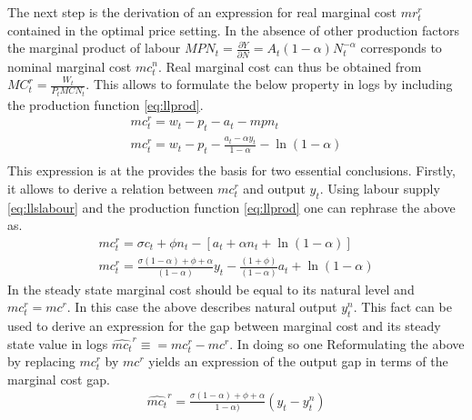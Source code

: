 \documentclass[12pt,a4paper,english]{article} %
\begin{document}
	The next step is the derivation of an expression for real marginal cost $mr_{t}^r$ contained in the optimal price setting. In the absence of other production factors the marginal product of labour $MPN_t = \frac{\partial Y}{\partial N} = A_t (1- \alpha) N_t^{-\alpha}$ corresponds to nominal marginal cost $mc_t^n$. Real marginal cost can thus be obtained from $MC_t^r = \frac{W_t}{P_t MCN_t}$. This allows to formulate the below property in logs by including the production function \eqref{eq:llprod}.
	\begin{equation}
		\begin{aligned}
			mc_t^r = w_t - p_t - a_t - mpn_t \\
			mc_t^r = w_t - p_t - \frac{a_t - \alpha y_t}{1 - \alpha} - \ln(1 - \alpha) \\
		\end{aligned}
	\end{equation}
	This expression is at the provides the basis for two essential conclusions. 
	Firstly, it allows to derive a relation between $mc_t^r$ and output $y_t$. Using labour supply \eqref{eq:llslabour} and the production function \eqref{eq:llprod} one can rephrase the above as. 
	\begin{equation}
		\begin{aligned}
			mc_t^r = \sigma c_t + \phi n_t - [a_t + \alpha n_t + \ln(1-\alpha)] \\
			mc_t^r = 
			\frac{
				\sigma (1 - \alpha) + \phi + \alpha
			}{
				(1 - \alpha)	
			}	 y_t
			- \frac{
				(1 + \phi)	
			}{
				(1 - \alpha)	
			} a_t
			+ \ln(1-\alpha)
		\end{aligned}
	\end{equation}
	In the steady state marginal cost should be equal to its natural level and $mc_t^r = mc^r$. In this case the above describes natural output $y_t^n$. This fact can be used to derive an expression for the gap between marginal cost and its steady state value in logs $\hat{mc_t}^r \equiv = mc_t^r - mc^r$. In doing so one 
	Reformulating the above by replacing $mc_t^r$ by $mc^r$ yields an expression of the output gap in terms of the marginal cost gap. 
	\begin{equation} \label{eq:llmcrhat}
		\begin{aligned}
			\hat{mc_t}^r = \frac{\sigma (1 - \alpha) + \phi + \alpha}
			{1 - \alpha)} (y_t - y_t^n)
		\end{aligned}
	\end{equation}
\end{document}
